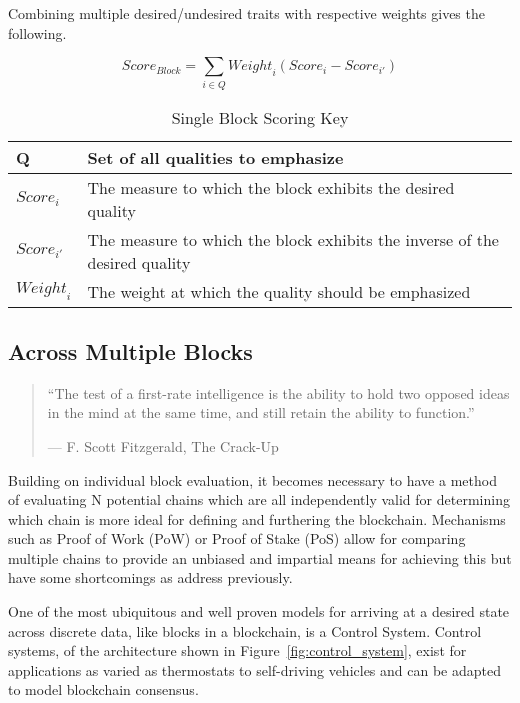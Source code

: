 \documentclass{article}
\begin{document}
Combining multiple desired/undesired traits with respective weights gives the
following.

\[
  \mathit{Score}_{\mathit{Block}} = \sum_{i \in Q} \mathit{Weight}_i (\mathit{Score}_i - \mathit{Score}_{i'})
\]

{
\renewcommand{\arraystretch}{1.5}
\begin{table}[h]
  \centering
  \begin{tabular}{|>{\RaggedRight\arraybackslash}l|>{\RaggedRight\arraybackslash}p{10cm}|}
    \hline
    Q                              & Set of all qualities to emphasize                                          \\
    \hline
    $\mathit{Score}_{\mathit{i}}$  & The measure to which the block exhibits the desired quality                \\
    \hline
    $\mathit{Score}_{\mathit{i'}}$ & The measure to which the block exhibits the inverse of the desired quality \\
    \hline
    $\mathit{Weight}_{\mathit{i}}$ & The weight at which the quality should be emphasized                       \\
    \hline
  \end{tabular}
  \caption{Single Block Scoring Key}
\end{table}
}

\subsection{Across Multiple Blocks}

\begin{quote}
  \enquote{The test of a first-rate intelligence is the ability to hold two opposed ideas in the mind at the same time, and still retain the ability to function.}

  \hfill — F. Scott Fitzgerald, The Crack-Up
\end{quote}

Building on individual block evaluation, it becomes necessary to have a method
of evaluating N potential chains which are all independently valid for
determining which chain is more ideal for defining and furthering the
blockchain. Mechanisms such as Proof of Work (PoW) or Proof of Stake (PoS)
allow for comparing multiple chains to provide an unbiased and impartial means
for achieving this but have some shortcomings as address previously.

One of the most ubiquitous and well proven models for arriving at a desired
state across discrete data, like blocks in a blockchain, is a Control System.
Control systems, of the architecture shown in Figure~\ref{fig:control_system},
exist for applications as varied as thermostats to self-driving vehicles and
can be adapted to model blockchain consensus.
\end{document}

